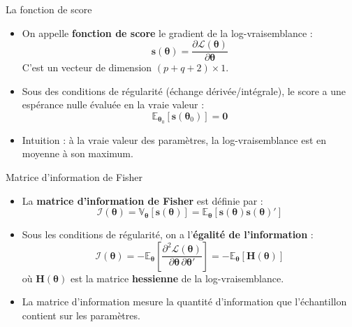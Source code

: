 \documentclass[11pt,aspectratio=169]{beamer}
\newcommand{\E}{\mathbb{E}}
\newcommand{\Var}{\mathbb{V}}
\begin{document}
\begin{frame}{La fonction de score}

\begin{itemize}

\item On appelle \textbf{fonction de score} le gradient de la log-vraisemblance :
  \[
  \mathbf{s}(\bm{\theta}) = \frac{\partial \mathcal{L}(\bm{\theta})}{\partial \bm{\theta}}
  \]
  C'est un vecteur de dimension $(p+q+2) \times 1$.\newline

\item Sous des conditions de régularité (échange dérivée/intégrale), le score a une espérance nulle évaluée en la vraie valeur :
  \[
  \E_{\bm{\theta}_0}\!\left[\mathbf{s}(\bm{\theta}_0)\right] = \mathbf{0}
  \]\newline

\item Intuition : à la vraie valeur des paramètres, la log-vraisemblance est en moyenne à son maximum.

\end{itemize}

\end{frame}

\begin{frame}{Matrice d'information de Fisher}

\begin{itemize}

\item La \textbf{matrice d'information de Fisher} est définie par :
  \[
  \mathcal{I}(\bm{\theta}) = \Var_{\bm{\theta}}\!\left[\mathbf{s}(\bm{\theta})\right] = \E_{\bm{\theta}}\!\left[\mathbf{s}(\bm{\theta})\mathbf{s}(\bm{\theta})'\right]
  \]\newline

\item Sous les conditions de régularité, on a l'\textbf{égalité de l'information} :
  \[
  \mathcal{I}(\bm{\theta}) = -\E_{\bm{\theta}}\!\left[\frac{\partial^2 \mathcal{L}(\bm{\theta})}{\partial \bm{\theta}\, \partial \bm{\theta}'}\right] = -\E_{\bm{\theta}}\!\left[\mathbf{H}(\bm{\theta})\right]
  \]
  où $\mathbf{H}(\bm{\theta})$ est la matrice \textbf{hessienne} de la log-vraisemblance.\newline

\item La matrice d'information mesure la quantité d'information que l'échantillon contient sur les paramètres.

\end{itemize}

\end{frame}
\end{document}
